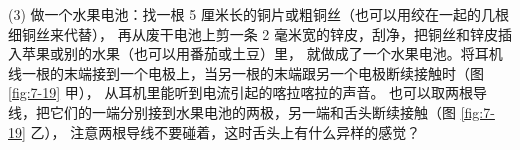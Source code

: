 (3) 做一个水果电池：找一根 5 厘米长的铜片或粗铜丝（也可以用绞在一起的几根细铜丝来代替），
再从废干电池上剪一条 2 毫米宽的锌皮，刮净，把铜丝和锌皮插入苹果或别的水果（也可以用番茄或土豆）里，
就做成了一个水果电池。将耳机线一根的末端接到一个电极上，当另一根的末端跟另一个电极断续接触时（图 \ref{fig:7-19} 甲），
从耳机里能听到电流引起的喀拉喀拉的声音。
也可以取两根导线，把它们的一端分别接到水果电池的两极，另一端和舌头断续接触（图 \ref{fig:7-19} 乙），
注意两根导线不要碰着，这时舌头上有什么异样的感觉？


